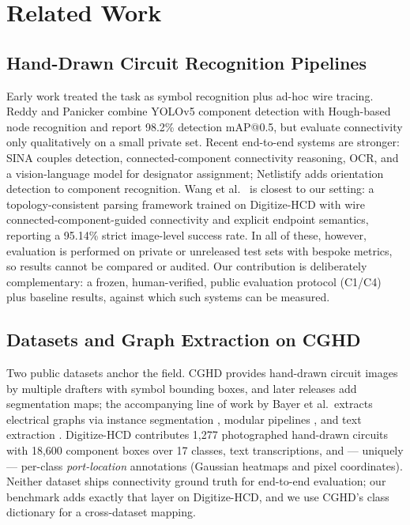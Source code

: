 \section{Related Work}
\label{sec:related}


\subsection{Hand-Drawn Circuit Recognition Pipelines}
Early work treated the task as symbol recognition plus ad-hoc wire
tracing. Reddy and Panicker \cite{reddy2022handdrawn} combine YOLOv5
component detection with Hough-based node recognition and report
98.2\% detection mAP@0.5, but evaluate connectivity only qualitatively
on a small private set. Recent end-to-end systems are stronger: SINA
\cite{sina2026} couples detection, connected-component connectivity
reasoning, OCR, and a vision-language model for designator assignment;
Netlistify \cite{netlistify} adds orientation detection to component
recognition. Wang et al.\ \cite{wang2026topology} is closest to our
setting: a topology-consistent parsing framework trained on
Digitize-HCD with wire connected-component-guided connectivity and
explicit endpoint semantics, reporting a 95.14\% strict image-level
success rate. In all of these, however, evaluation is performed on
private or unreleased test sets with bespoke metrics, so results
cannot be compared or audited. Our contribution is deliberately
complementary: a frozen, human-verified, public evaluation protocol
(C1/C4) plus baseline results, against which such systems can be
measured.

\subsection{Datasets and Graph Extraction on CGHD}
Two public datasets anchor the field. CGHD \cite{cghd} provides
hand-drawn circuit images by multiple drafters with symbol bounding
boxes, and later releases add segmentation maps; the accompanying line
of work by Bayer et al.\ extracts electrical graphs via instance
segmentation \cite{bayer2023instance}, modular pipelines
\cite{bayer2024modular}, and text extraction \cite{bayer2023text}.
Digitize-HCD \cite{digitizehcd_data} contributes 1{,}277 photographed
hand-drawn circuits with 18{,}600 component boxes over 17 classes,
text transcriptions, and — uniquely — per-class \emph{port-location}
annotations (Gaussian heatmaps and pixel coordinates). Neither dataset
ships connectivity ground truth for end-to-end evaluation; our
benchmark adds exactly that layer on Digitize-HCD, and we use CGHD's
class dictionary for a cross-dataset mapping. 

